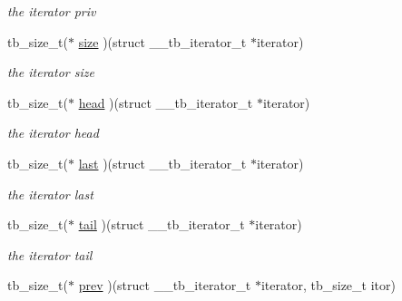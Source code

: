 \begin{DoxyCompactItemize}
\begin{DoxyCompactList}\small\item\em the iterator priv \end{DoxyCompactList}\item 
\hypertarget{structtb__iterator__t_a207eb4f4199b1f771ed07fd03f341934}{tb\-\_\-size\-\_\-t($\ast$ \hyperlink{structtb__iterator__t_a207eb4f4199b1f771ed07fd03f341934}{size} )(struct \-\_\-\-\_\-tb\-\_\-iterator\-\_\-t $\ast$iterator)}\label{structtb__iterator__t_a207eb4f4199b1f771ed07fd03f341934}

\begin{DoxyCompactList}\small\item\em the iterator size \end{DoxyCompactList}\item 
\hypertarget{structtb__iterator__t_affa31acf32f7c947b74710962e24ab0e}{tb\-\_\-size\-\_\-t($\ast$ \hyperlink{structtb__iterator__t_affa31acf32f7c947b74710962e24ab0e}{head} )(struct \-\_\-\-\_\-tb\-\_\-iterator\-\_\-t $\ast$iterator)}\label{structtb__iterator__t_affa31acf32f7c947b74710962e24ab0e}

\begin{DoxyCompactList}\small\item\em the iterator head \end{DoxyCompactList}\item 
\hypertarget{structtb__iterator__t_a150a4a912ad1eb84c8171962759376b1}{tb\-\_\-size\-\_\-t($\ast$ \hyperlink{structtb__iterator__t_a150a4a912ad1eb84c8171962759376b1}{last} )(struct \-\_\-\-\_\-tb\-\_\-iterator\-\_\-t $\ast$iterator)}\label{structtb__iterator__t_a150a4a912ad1eb84c8171962759376b1}

\begin{DoxyCompactList}\small\item\em the iterator last \end{DoxyCompactList}\item 
\hypertarget{structtb__iterator__t_a6ade5496cb3b8c0bf29a92735b1f56d7}{tb\-\_\-size\-\_\-t($\ast$ \hyperlink{structtb__iterator__t_a6ade5496cb3b8c0bf29a92735b1f56d7}{tail} )(struct \-\_\-\-\_\-tb\-\_\-iterator\-\_\-t $\ast$iterator)}\label{structtb__iterator__t_a6ade5496cb3b8c0bf29a92735b1f56d7}

\begin{DoxyCompactList}\small\item\em the iterator tail \end{DoxyCompactList}\item 
\hypertarget{structtb__iterator__t_a9071355443d00b1a4e3074a369459424}{tb\-\_\-size\-\_\-t($\ast$ \hyperlink{structtb__iterator__t_a9071355443d00b1a4e3074a369459424}{prev} )(struct \-\_\-\-\_\-tb\-\_\-iterator\-\_\-t $\ast$iterator, tb\-\_\-size\-\_\-t itor)}\label{structtb__iterator__t_a9071355443d00b1a4e3074a369459424}


\end{DoxyCompactItemize}
